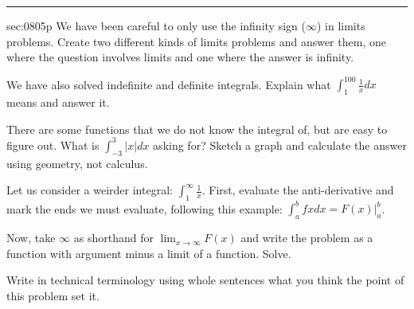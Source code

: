 \renewcommand{\columnseprule}{1.5pt}
\begin{multicols*}{2}
\rule[0.5\baselineskip]{0.4\textwidth}{1pt}
\noindent
{}\label{sec:0805p}
\begin{exercises}{sec:0805p}
\lab{} We have been careful to only use the infinity sign ($\infty$) in limits problems.  Create two different kinds of limits problems and answer them, one where the question involves limits and one where the answer is infinity.

\vspace{5cm}
\lab{} We have also solved indefinite and definite integrals.  Explain what $\int_1^{100}\frac{1}{x}dx$ means and answer it.

\vspace{5cm}
\lab{} There are some functions that we do not know the integral of, but are easy to figure out.  What is $\int_{-3}^{3}|x|dx$ asking for?  Sketch a graph and calculate the answer using geometry, not calculus.

\vspace{6cm}
\lab{} Let us consider a weirder integral: $\int_1^{\infty}\frac{1}{x}$. First, evaluate the anti-derivative and mark the ends we must evaluate, following this example: $\int_a^b f{x}dx=\left. F(x)\right|_a^b$.

\vspace{5cm}
\lab{} Now, take $\infty$ as shorthand for $\displaystyle\lim_{x\rightarrow\infty}F(x)$ and write the problem as a function with argument minus a limit of a function.  Solve.

\vspace{5cm}
\lab{} Write in technical terminology using whole sentences what you think the point of this problem set it.
\end{exercises}
\end{multicols*}